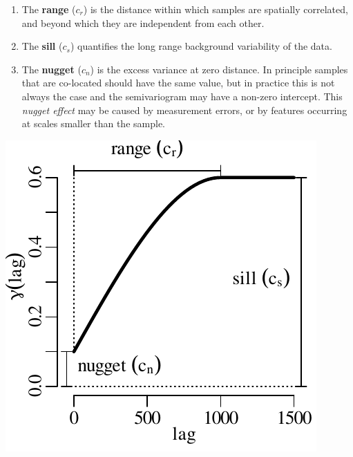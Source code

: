 \begin{enumerate}
\item The \textbf{range} ($c_r$) is the distance within which samples
  are spatially correlated, and beyond which they are independent from
  each other.

\item The \textbf{sill} ($c_s$) quantifies the long range background
  variability of the data.

\item The \textbf{nugget} ($c_n$) is the excess variance at zero
  distance. In principle samples that are co-located should have the
  same value, but in practice this is not always the case and the
  semivariogram may have a non-zero intercept. This \textit{nugget
    effect} may be caused by measurement errors, or by features
  occurring at scales smaller than the sample.
\end{enumerate}

\noindent\begin{minipage}[t][][b]{.35\textwidth}
\includegraphics[width=\textwidth]{../figures/snr.pdf}
\end{minipage}
\begin{minipage}[t][][t]{.65\textwidth}
  \label{fig:snr}
\end{minipage}

